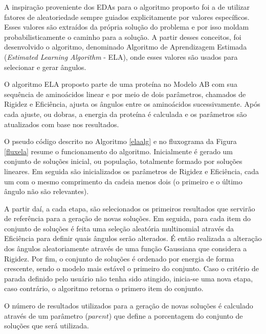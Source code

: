 \documentclass[dm,ppgcomp]{texfurg}
\begin{document}
A inspiração proveniente dos EDAs para o algoritmo proposto foi a de utilizar fatores de aleatoriedade sempre guiados explicitamente por valores específicos. Esses valores são extraídos da própria solução do problema e por isso moldam probabilisticamente o caminho para a solução. A partir desses conceitos, foi desenvolvido o algoritmo, denominado Algoritmo de Aprendizagem Estimada ({\it Estimated Learning Algorithm} - ELA), onde esses valores são usados para selecionar e gerar ângulos. 

O algoritmo ELA proposto parte de uma proteína no Modelo AB com sua sequência de aminoácidos linear e por meio de dois parâmetros, chamados de Rigidez e Eficiência, ajusta os ângulos entre os aminoácidos sucessivamente. Após cada ajuste, ou dobras, a energia da proteína é calculada e os parâmetros são atualizados com base nos resultados. 

O pseudo código descrito no Algoritmo \ref{elaalg} e no fluxograma da Figura \ref{fluxela} resume o funcionamento do algoritmo. Inicialmente é gerado um conjunto de soluções inicial, ou população, totalmente formado por soluções lineares. Em seguida são inicializados os parâmetros de Rigidez e Eficiência, cada um com o mesmo comprimento da cadeia menos dois (o primeiro e o último ângulo não são relevantes). 

A partir daí, a cada etapa, são selecionados os primeiros resultados que servirão de referência para a geração de novas soluções. Em seguida, para cada item do conjunto de soluções é feita uma seleção aleatória multinomial através da Eficiência para definir quais ângulos serão alterados. É então realizada a alteração dos ângulos aleatoriamente através de uma função Gaussiana que considera a Rigidez. Por fim, o conjunto de soluções é ordenado por energia de forma crescente, sendo o modelo mais estável o primeiro do conjunto. Caso o critério de parada definido pelo usuário não tenha sido atingido, inicia-se uma nova etapa, caso contrário, o algoritmo retorna o primero item do conjunto.

O número de resultados utilizados para a geração de novas soluções é calculado através de um parâmetro ($parent$) que define a porcentagem do conjunto de soluções que será utilizada. 
\end{document}
